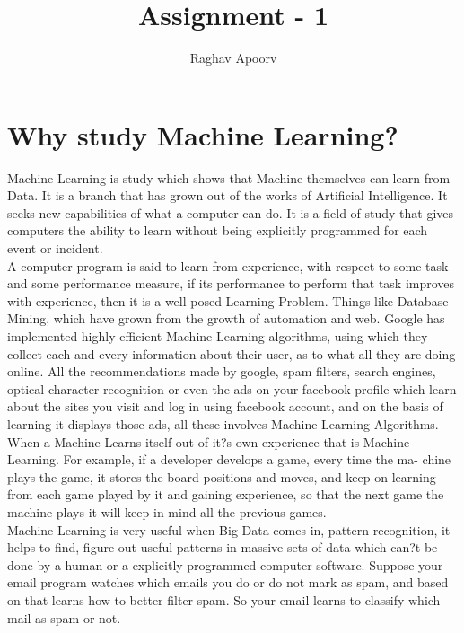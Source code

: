 \documentclass[a4paper, 12pt]{article}
\title{Assignment - 1}
\author{Raghav Apoorv}
\date{}
\begin{document}
\maketitle

\section{Why study Machine Learning?}

Machine Learning is study which shows that Machine themselves can learn from Data. It is a branch that has grown out of the works of Artificial Intelligence. It seeks new capabilities of what a computer can do. It is a field of study that gives computers the ability to learn without being explicitly programmed for each event or incident.\\

A computer program is said to learn from experience, with respect to some task and some performance measure, if its performance to perform that task improves with experience, then it is a well posed Learning Problem. Things like Database Mining, which have grown from the growth of automation and web. Google has implemented highly efficient Machine Learning algorithms, using which they collect each and every information about their user, as to what all they are doing online. All the recommendations made by google, spam filters, search engines, optical character recognition or even the ads on your facebook profile which learn about the sites you visit and log in using facebook account, and on the basis of learning it displays those ads, all these involves Machine Learning Algorithms.\\

When a Machine Learns itself out of it?s own experience that is Machine Learning. For example, if a developer develops a game, every time the ma- chine plays the game, it stores the board positions and moves, and keep on learning from each game played by it and gaining experience, so that the next game the machine plays it will keep in mind all the previous games.\\

Machine Learning is very useful when Big Data comes in, pattern recognition, it helps to find, figure out useful patterns in massive sets of data which can?t be done by a human or a explicitly programmed computer software. Suppose your email program watches which emails you do or do not mark as spam, and based on that learns how to better filter spam. So your email learns to classify which mail as spam or not.
\end{document}
